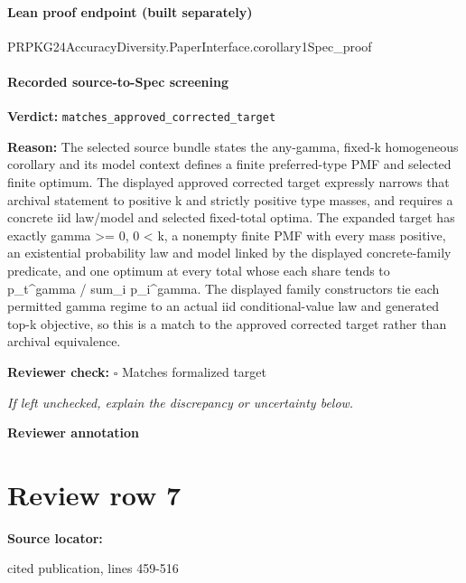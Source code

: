 \documentclass[10pt]{article}
\newcommand{\reviewerbox}{%
  \par\noindent\fbox{\parbox{0.96\linewidth}{\rule{0pt}{0.38in}}}\par
}
\newcommand{\reviewmatch}[1]{%
  \par\noindent\textbf{Reviewer check:} $\square$\; #1\par
  \noindent\emph{If left unchecked, explain the discrepancy or uncertainty below.}\par
}
\begin{document}
\paragraph{Lean proof endpoint (built separately)}\begin{ReviewVerbatim}
PRPKG24AccuracyDiversity.PaperInterface.corollary1Spec_proof
\end{ReviewVerbatim}

\paragraph{Recorded source-to-Spec screening}
\textbf{Verdict:} \texttt{matches\_approved\_corrected\_target}
\\
{\raggedright
\textbf{Reason:} The selected source bundle states the any-\allowbreak{}gamma, fixed-\allowbreak{}k homogeneous corollary and its model context defines a finite preferred-\allowbreak{}type PMF and selected finite optimum.\allowbreak{} The displayed approved corrected target expressly narrows that archival statement to positive k and strictly positive type masses, and requires a concrete iid law/\allowbreak{}model and selected fixed-\allowbreak{}total optima.\allowbreak{} The expanded target has exactly gamma >= 0, 0 < k, a nonempty finite PMF with every mass positive, an existential probability law and model linked by the displayed concrete-\allowbreak{}family predicate, and one optimum at every total whose each share tends to p\_\allowbreak{}t\textasciicircum{}gamma /\allowbreak{} sum\_\allowbreak{}i p\_\allowbreak{}i\textasciicircum{}gamma.\allowbreak{} The displayed family constructors tie each permitted gamma regime to an actual iid conditional-\allowbreak{}value law and generated top-\allowbreak{}k objective, so this is a match to the approved corrected target rather than archival equivalence.\allowbreak{}
\par}
\reviewmatch{Matches formalized target}
\noindent\textbf{Reviewer annotation}\par
\reviewerbox
\clearpage
\hypertarget{source-claim-e58423f2214d3283}{}
\section*{Review row 7}
\textbf{Source locator:} {\footnotesize\raggedright cited publication, lines 459-\allowbreak{}516\par}
\end{document}
